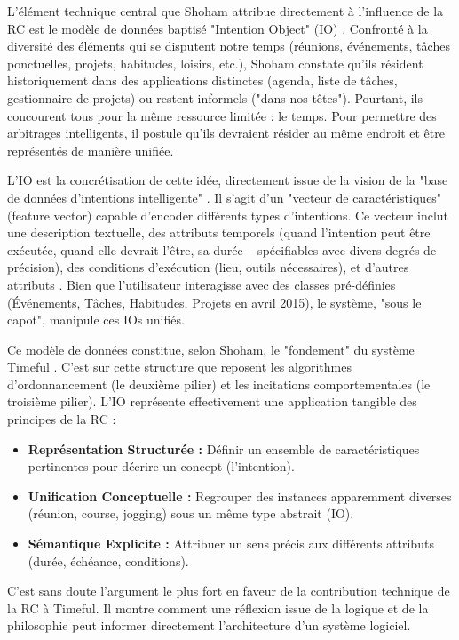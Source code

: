 \documentclass[11pt,a4paper]{article}
\begin{document}
L'élément technique central que Shoham attribue directement à l'influence de la RC est le modèle de données baptisé "Intention Object" (IO) \citep{Shoham2015Why}. Confronté à la diversité des éléments qui se disputent notre temps (réunions, événements, tâches ponctuelles, projets, habitudes, loisirs, etc.), Shoham constate qu'ils résident historiquement dans des applications distinctes (agenda, liste de tâches, gestionnaire de projets) ou restent informels ("dans nos têtes"). Pourtant, ils concourent tous pour la même ressource limitée : le temps. Pour permettre des arbitrages intelligents, il postule qu'ils devraient résider au même endroit et être représentés de manière unifiée.

L'IO est la concrétisation de cette idée, directement issue de la vision de la "base de données d'intentions intelligente" \citep{Shoham2009Logics}. Il s'agit d'un "vecteur de caractéristiques" (feature vector) capable d'encoder différents types d'intentions. Ce vecteur inclut une description textuelle, des attributs temporels (quand l'intention peut être exécutée, quand elle devrait l'être, sa durée – spécifiables avec divers degrés de précision), des conditions d'exécution (lieu, outils nécessaires), et d'autres attributs \citep{Shoham2015Why}. Bien que l'utilisateur interagisse avec des classes pré-définies (Événements, Tâches, Habitudes, Projets en avril 2015), le système, "sous le capot", manipule ces IOs unifiés.

Ce modèle de données constitue, selon Shoham, le "fondement" du système Timeful \citep{Shoham2015Why}. C'est sur cette structure que reposent les algorithmes d'ordonnancement (le deuxième pilier) et les incitations comportementales (le troisième pilier). L'IO représente effectivement une application tangible des principes de la RC :
\begin{itemize}
    \item \textbf{Représentation Structurée :} Définir un ensemble de caractéristiques pertinentes pour décrire un concept (l'intention).
    \item \textbf{Unification Conceptuelle :} Regrouper des instances apparemment diverses (réunion, course, jogging) sous un même type abstrait (IO).
    \item \textbf{Sémantique Explicite :} Attribuer un sens précis aux différents attributs (durée, échéance, conditions).
\end{itemize}
C'est sans doute l'argument le plus fort en faveur de la contribution technique de la RC à Timeful. Il montre comment une réflexion issue de la logique et de la philosophie peut informer directement l'architecture d'un système logiciel.
\end{document}
